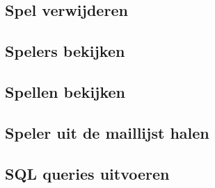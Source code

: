 \documentclass[12pt]{article}
\begin{document}
  \subsection{Spel verwijderen}
  
  \subsection{Spelers bekijken}
  
  \subsection{Spellen bekijken}
  
  \subsection{Speler uit de maillijst halen}
  
  \subsection{SQL queries uitvoeren}
\end{document}
